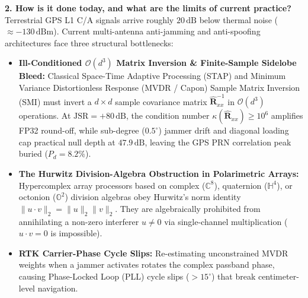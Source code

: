 \documentclass[10pt,a4paper]{article}
\newcommand{\C}{\mathbb{C}}
\newcommand{\Ha}{\mathbb{H}}
\newcommand{\Oc}{\mathbb{O}}
\begin{document}
\textbf{2. How is it done today, and what are the limits of current practice?}\\
Terrestrial GPS L1 C/A signals arrive roughly $20\,\mathrm{dB}$ below thermal noise ($\approx -130\,\mathrm{dBm}$). Current multi-antenna anti-jamming and anti-spoofing architectures face three structural bottlenecks:
\begin{itemize}
    \item \textbf{Ill-Conditioned $\mathcal{O}(d^3)$ Matrix Inversion \& Finite-Sample Sidelobe Bleed:} Classical Space-Time Adaptive Processing (STAP) and Minimum Variance Distortionless Response (MVDR / Capon) Sample Matrix Inversion (SMI) must invert a $d \times d$ sample covariance matrix $\hat{\bm{R}}_{xx}^{-1}$ in $\mathcal{O}(d^3)$ operations. At $\mathrm{JSR} = +80\,\mathrm{dB}$, the condition number $\kappa(\hat{\bm{R}}_{xx}) \ge 10^6$ amplifies FP32 round-off, while sub-degree ($0.5^\circ$) jammer drift and diagonal loading cap practical null depth at $47.9\,\mathrm{dB}$, leaving the GPS PRN correlation peak buried ($P_d = 8.2\%$).
    \item \textbf{The Hurwitz Division-Algebra Obstruction in Polarimetric Arrays:} Hypercomplex array processors based on complex ($\C^8$), quaternion ($\Ha^4$), or octonion ($\Oc^2$) division algebras obey Hurwitz's norm identity $\|u \cdot v\|_2 = \|u\|_2 \|v\|_2$. They are algebraically prohibited from annihilating a non-zero interferer $u \neq 0$ via single-channel multiplication ($u \cdot v = 0$ is impossible).
    \item \textbf{RTK Carrier-Phase Cycle Slips:} Re-estimating unconstrained MVDR weights when a jammer activates rotates the complex passband phase, causing Phase-Locked Loop (PLL) cycle slips ($>15^\circ$) that break centimeter-level navigation.
\end{itemize}
\end{document}
